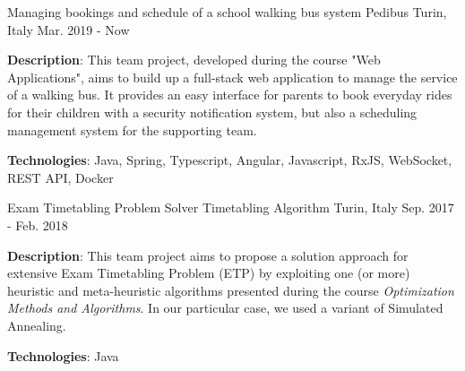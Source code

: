 {\begin{cventries}
  \cventry
  {Managing bookings and schedule of a school walking bus system} %
  {Pedibus} %
  {Turin, Italy} %
  {Mar. 2019 - Now} %
  {
   \begin{cvitems} %
     \item {\textbf{Description}: This team project, developed during the course "Web Applications", aims to build up a full-stack web application to manage the service of a walking bus. It provides an easy interface for parents to book everyday rides for their children with a security notification system, but also a scheduling management system for the supporting team.}
      \item {\textbf{Technologies}: Java, Spring, Typescript, Angular, Javascript, RxJS, WebSocket, REST API, Docker}
   \end{cvitems}
  }

  \cventry
    {Exam Timetabling Problem Solver} %
    {Timetabling Algorithm} %
    {Turin, Italy} %
    {Sep. 2017 - Feb. 2018} %
    {
      \begin{cvitems} %
        \item {\textbf{Description}: This team project aims to propose a solution approach for extensive Exam Timetabling Problem (ETP) by exploiting one (or more) heuristic and meta-heuristic algorithms presented during the course \textit{Optimization Methods and Algorithms}. In our particular case, we used a variant of Simulated Annealing.}
        \item {\textbf{Technologies}: Java}
      \end{cvitems}
    }
\end{cventries}
}

